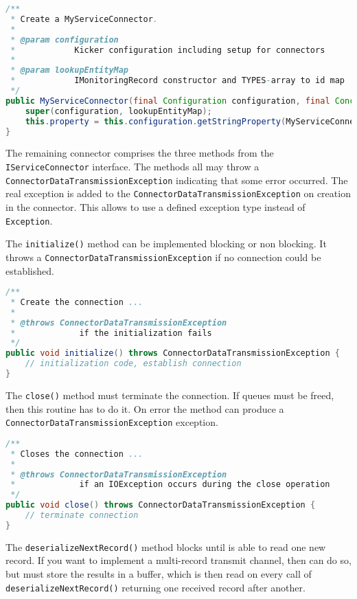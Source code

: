 \documentclass[11pt,a4paper]{article}
\begin{document}
\begin{lstlisting}[language=Java,caption=Example connector declaration]
/**
 * Create a MyServiceConnector.
 * 
 * @param configuration
 *            Kicker configuration including setup for connectors
 * 
 * @param lookupEntityMap
 *            IMonitoringRecord constructor and TYPES-array to id map
 */
public MyServiceConnector(final Configuration configuration, final ConcurrentMap<Integer, LookupEntity> lookupEntityMap) {
	super(configuration, lookupEntityMap);
	this.property = this.configuration.getStringProperty(MyServiceConnector.PROPERTY);
}
\end{lstlisting}

\noindent The remaining connector comprises the three methods from the \texttt{IServiceConnector} interface. The methods all may throw a \texttt{ConnectorDataTransmissionException} indicating that some error occurred. The real exception is added to the \texttt{ConnectorDataTransmissionException} on creation in the connector. This allows to use a defined exception type instead of \texttt{Exception}.

The \texttt{initialize()} method can be implemented blocking or non blocking. It throws a \texttt{ConnectorDataTransmissionException} if no connection could be established. 

\begin{lstlisting}[language=Java,caption=Initialization method]
/**
 * Create the connection ...
 * 
 * @throws ConnectorDataTransmissionException
 *             if the initialization fails
 */
public void initialize() throws ConnectorDataTransmissionException {
	// initialization code, establish connection
}
\end{lstlisting}

\noindent The \texttt{close()} method must terminate the connection. If queues must be freed, then this routine has to do it. On error the method can produce a \texttt{ConnectorDataTransmissionException} exception.

\begin{lstlisting}[language=Java,caption=Close method]
/**
 * Closes the connection ...
 * 
 * @throws ConnectorDataTransmissionException
 *             if an IOException occurs during the close operation
 */
public void close() throws ConnectorDataTransmissionException {
	// terminate connection
}
\end{lstlisting}

\noindent The \texttt{deserializeNextRecord()} method blocks until is able to read one new record. If you want to implement a multi-record transmit channel, then can do so, but must store the results in a buffer, which is then read on every call of \texttt{deserializeNextRecord()} returning one received record after another.
\end{document}
